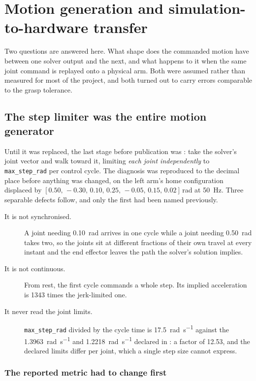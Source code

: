 \chapter{Motion generation and simulation-to-hardware transfer}
\label{ch:motion}

Two questions are answered here. What shape does the commanded motion have
between one solver output and the next, and what happens to it when the same
joint command is replayed onto a physical arm. Both were assumed rather than
measured for most of the project, and both turned out to carry errors
comparable to the grasp tolerance.

\section{The step limiter was the entire motion generator}

Until it was replaced, the last stage before publication was
: take the solver's joint vector and
walk toward it, limiting \emph{each joint independently} to
\texttt{max\_step\_rad} per control cycle. The diagnosis was reproduced to the
decimal place before anything was changed, on the left arm's home
configuration displaced by
$[0.50,\, -0.30,\, 0.10,\, 0.25,\, -0.05,\, 0.15,\, 0.02]$\,\si{\radian} at
\SI{50}{\hertz}. Three separable defects follow, and only the first had been
named previously.

\begin{description}
  \item[It is not synchronised.] A joint needing \SI{0.10}{\radian} arrives in
    one cycle while a joint needing \SI{0.50}{\radian} takes two, so the
    joints sit at different fractions of their own travel at every instant and
    the end effector leaves the path the solver's solution implies.
  \item[It is not continuous.] From rest, the first cycle commands a whole
    step. Its implied acceleration is \num{1343} times the jerk-limited one.
  \item[It never read the joint limits.] \texttt{max\_step\_rad} divided by
    the cycle time is \SI{17.5}{\radian\per\second} against the
    \SI{1.3963}{\radian\per\second} and \SI{1.2218}{\radian\per\second}
    declared in : a factor of \num{12.53}, and the
    declared limits differ per joint, which a single step size cannot express.
\end{description}

\subsection{The reported metric had to change first}

